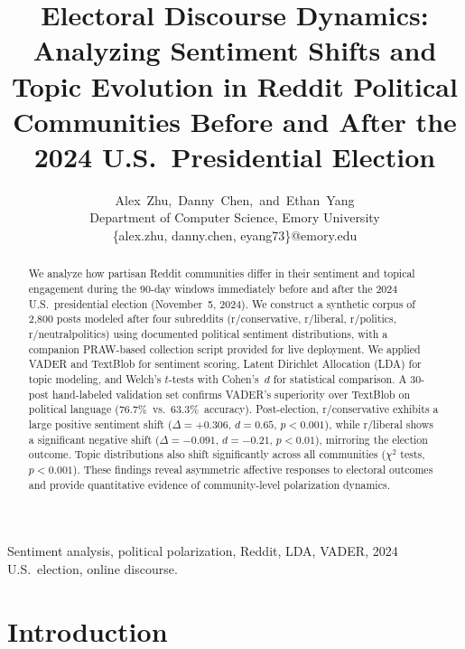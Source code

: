 \documentclass[journal]{IEEEtran}
\begin{document}
\title{Electoral Discourse Dynamics: Analyzing Sentiment Shifts and Topic
       Evolution in Reddit Political Communities Before and After the
       2024 U.S.\ Presidential Election}

\author{Alex~Zhu,~Danny~Chen,~and~Ethan~Yang\\
        Department of Computer Science, Emory University\\
        \{alex.zhu, danny.chen, eyang73\}@emory.edu}

\maketitle

\begin{abstract}
We analyze how partisan Reddit communities differ in their sentiment
and topical engagement during the 90-day windows immediately before
and after the 2024 U.S.\ presidential election (November~5, 2024).
We construct a synthetic corpus of 2,800 posts modeled after four
subreddits (r/conservative, r/liberal, r/politics, r/neutralpolitics)
using documented political sentiment distributions, with a companion
PRAW-based collection script provided for live deployment. We applied
VADER and TextBlob for sentiment scoring, Latent Dirichlet Allocation
(LDA) for topic modeling, and Welch's $t$-tests with Cohen's~$d$ for
statistical comparison. A 30-post hand-labeled validation set confirms
VADER's superiority over TextBlob on political language (76.7\%\ vs.\
63.3\%\ accuracy). Post-election, r/conservative exhibits a large
positive sentiment shift ($\Delta = +0.306$, $d = 0.65$, $p < 0.001$),
while r/liberal shows a significant negative shift ($\Delta = -0.091$,
$d = -0.21$, $p < 0.01$), mirroring the election outcome. Topic
distributions also shift significantly across all communities
($\chi^2$ tests, $p < 0.001$). These findings reveal asymmetric
affective responses to electoral outcomes and provide quantitative
evidence of community-level polarization dynamics.
\end{abstract}

\begin{IEEEkeywords}
Sentiment analysis, political polarization, Reddit, LDA, VADER, 2024
U.S.\ election, online discourse.
\end{IEEEkeywords}

\section{Introduction}
\end{document}
